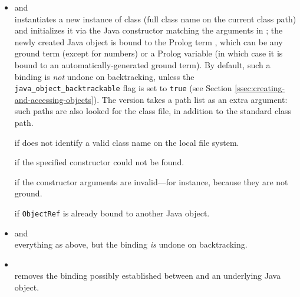 \begin{itemize}

\item {} and \\
    \noindent {} instantiates a new instance of class  (full class name on the current class path) and initializes it via the Java constructor matching the arguments in ; the newly created Java object is bound to the Prolog term , which can be any ground term (except for numbers) or a Prolog variable (in which case it is bound to an  automatically-generated ground term).
    By default, such a binding is \textit{not} undone on backtracking, unless the \texttt{java\_object\_backtrackable} flag is set to \texttt{true} (see Section \ref{ssec:creating-and-accessing-objects}).
    The  version takes a path list as an extra argument: such paths are also looked for the class file, in addition to the standard class path.



     if  does not identify a valid class name on the local file system.

     if the specified constructor could not be found.

     if the constructor arguments are invalid---for instance, because they are not ground.

     if \texttt{ObjectRef} is already bound to another Java object.


\item {} and \\
    everything as above, but the binding \textit{is} undone on backtracking.

\item {}\\
    \noindent{} removes the binding possibly established between  and an underlying Java object.


\end{itemize}
